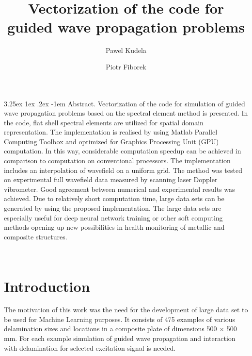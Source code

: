 \documentclass[runningheads]{llncs}
\makeatletter
\renewcommand\paragraph{\@startsection{paragraph}{4}{\z@}%
                                    {3.25ex \@plus1ex \@minus.2ex}%
                                    {-1em}%
                                    {\normalfont\normalsize\bfseries}}
\makeatother
\begin{document}
%
\title{Vectorization of the code for guided wave propagation problems}
%
%
\author{Pawel Kudela\inst{}  \and 
Piotr Fiborek\inst{}\orcidID{[0000-0002-5030-3312} 
}
%
%

%
\maketitle              %
%
\paragraph{Abstract.}
Vectorization of the code for simulation of guided wave propagation problems based on the spectral element method is presented. 
In the code, flat shell spectral elements are utilized for spatial domain representation.
The implementation is realised by using Matlab Parallel Computing Toolbox and optimized for Graphics Processing Unit (GPU) computation. 
In this way, considerable computation speedup can be achieved in comparison to computation on conventional processors. 
The implementation includes an interpolation of wavefield on a uniform grid. 
The method was tested on experimental full wavefield data measured by scanning laser Doppler vibrometer. 
Good agreement between numerical and experimental results was achieved. 
Due to relatively short computation time, large data sets can be generated by using the proposed implementation. 
The large data sets are especially useful for deep neural network training or other soft computing methods opening up new possibilities in health monitoring of metallic and composite structures.

%
\\[2em]
%
\section{Introduction}
The motivation of this work was the need for the development of large data set to be used for Machine Learning purposes. 
It consists of 475 examples of various delamination sizes and locations in a composite plate of dimensions 500 \(\times\) 500 mm.
For each example simulation of guided wave propagation and interaction with delamination for selected excitation signal is needed.
 
\end{document}
